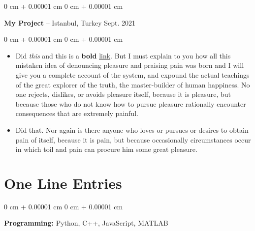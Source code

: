 \documentclass[10pt, letterpaper]{article}
\newenvironment{highlights}{
    \begin{itemize}[
        topsep=0.10 cm,
        parsep=0.10 cm,
        partopsep=0pt,
        itemsep=0pt,
        leftmargin=0 cm + 10pt
    ]
}{
    \end{itemize}
} %
\newenvironment{onecolentry}{
    \begin{adjustwidth}{
        0 cm + 0.00001 cm
    }{
        0 cm + 0.00001 cm
    }
}{
    \end{adjustwidth}
} %
\newenvironment{twocolentry}[2][]{
    \onecolentry
    \def\secondColumn{#2}
    \setcolumnwidth{\fill, 4.5 cm}
    \begin{paracol}{2}
}{
    \switchcolumn \raggedleft \secondColumn
    \end{paracol}
    \endonecolentry
} %
\begin{document}
        \vspace{0.2 cm}

        \begin{twocolentry}{
            Sept. 2021
        }
            \textbf{My Project} -- Istanbul, Turkey\end{twocolentry}

        \vspace{0.10 cm}
        \begin{onecolentry}
            \begin{highlights}
                \item Did \textit{this} and this is a \textbf{bold} \href{https://example.com}{link}. But I must explain to you how all this mistaken idea of denouncing pleasure and praising pain was born and I will give you a complete account of the system, and expound the actual teachings of the great explorer of the truth, the master-builder of human happiness. No one rejects, dislikes, or avoids pleasure itself, because it is pleasure, but because those who do not know how to pursue pleasure rationally encounter consequences that are extremely painful.
                \item Did that. Nor again is there anyone who loves or pursues or desires to obtain pain of itself, because it is pain, but because occasionally circumstances occur in which toil and pain can procure him some great pleasure.
            \end{highlights}
        \end{onecolentry}



    
    \section{One Line Entries}



        
        \begin{onecolentry}
            \textbf{Pro\textnormal{gram}ming:} Python, C++, JavaScript, MATLAB
        \end{onecolentry}


    
\end{document}
